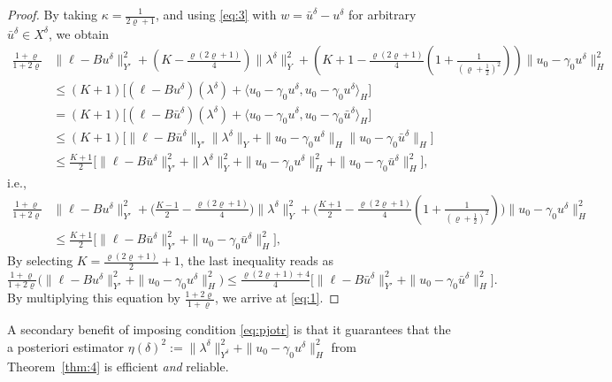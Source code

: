 \documentclass{amsart}
\numberwithin{equation}{section}
\newcommand{\1}{\mathbb 1}
\begin{document}
\begin{proof}
 By taking $\kappa=\frac{1}{2\varrho +1}$, and using \eqref{eq:3} with $w=\bar{u}^\delta-u^\delta$ for arbitrary $\bar{u}^\delta \in X^\delta$, we obtain
\begin{align*}
\tfrac{1+\varrho}{1+2\varrho} &\|\ell-B u^\delta\|_{Y'}^2+(K-\tfrac{\varrho(2\varrho+1)}{4})\|\lambda^\delta\|_Y^2+(K+1-\tfrac{\varrho(2\varrho+1)}{4}(1+\tfrac{1}{(\varrho+\frac12)^2}))\|u_0-\gamma_0 u^\delta\|_H^2\\
& \leq (K+1)\big[(\ell-B u^\delta)(\lambda^\delta)+\langle u_0-\gamma_0 u^\delta, u_0-\gamma_0 u^\delta \rangle_H \big]\\
& = (K+1)\big[(\ell-B \bar{u}^\delta)(\lambda^\delta)+\langle u_0-\gamma_0 u^\delta, u_0-\gamma_0 \bar{u}^\delta \rangle_H \big]\\
& \leq (K+1)\big[\|\ell-B \bar{u}^\delta\|_{Y'}\|\lambda^\delta\|_Y+\|u_0-\gamma_0 u^\delta\|_H \|u_0-\gamma_0 \bar{u}^\delta \|_H \big]\\
& \leq \tfrac{K+1}{2} \big[\|\ell-B \bar{u}^\delta\|_{Y'}^2 + \|\lambda^\delta\|_Y^2+\|u_0-\gamma_0 u^\delta\|_H^2+ \|u_0-\gamma_0 \bar{u}^\delta \|^2_H \big],
\end{align*}
i.e.,
\begin{align*}
\tfrac{1+\varrho}{1+2\varrho} &\|\ell-B u^\delta\|_{Y'}^2+\big(\tfrac{K-1}{2}-\tfrac{\varrho(2\varrho+1)}{4}\big)\|\lambda^\delta\|_Y^2+\big(\tfrac{K+1}{2}-\tfrac{\varrho(2\varrho+1)}{4}(1+\tfrac{1}{(\varrho+\frac12)^2})\big)\|u_0-\gamma_0 u^\delta\|_H^2\\
&  \leq \tfrac{K+1}{2} \big[\|\ell-B \bar{u}^\delta\|_{Y'}^2 + \|u_0-\gamma_0 \bar{u}^\delta \|^2_H \big],
\end{align*}
By selecting $K=\frac{\varrho(2\varrho+1)}{2}+1$, the last inequality reads as 
$$
\tfrac{1+\varrho}{1+2\varrho} \big(\|\ell-B u^\delta\|_{Y'}^2+\|u_0-\gamma_0 u^\delta\|_H^2\big) \leq \tfrac{\varrho(2\varrho+1)+4}{4} \big[\|\ell-B \bar{u}^\delta\|_{Y'}^2 + \|u_0-\gamma_0 \bar{u}^\delta \|^2_H \big].
$$
By multiplying this  equation by $\tfrac{1+2\varrho}{1+\varrho}$, we arrive at \eqref{eq:1}.
 \end{proof}
 
 A secondary benefit of imposing condition \eqref{eq:pjotr} is that it guarantees that the a posteriori estimator 
 $\eta(\delta)^2:=\|\lambda^\delta\|_{Y^\delta}^2+\|u_0-\gamma_0 u^\delta\|_H^2$ from Theorem~\ref{thm:4} is efficient \emph{and} reliable.
 
\end{document}
